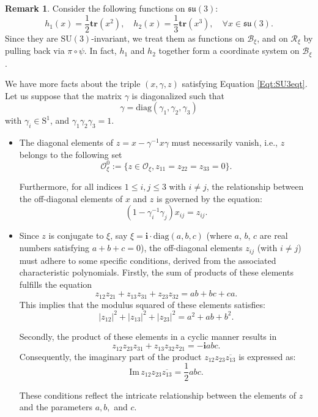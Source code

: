 \documentclass[12pt]{amsart}
\theoremstyle{definition}
\newtheorem{remark}[theorem]{Remark}
\numberwithin{equation}{section}
\def\diag{\mathrm{diag}}
\def\Im{\mathrm{Im}\,}
\newcommand{\abs}[1]{\lvert#1\rvert}
\newcommand{\Sone}{\mathrm{S}^1}
\newcommand{\imagunit}{\mathbf{i}}
\newcommand{\SU}{\mathrm{SU}}
\newcommand{\su}{\mathfrak{su}}
\newcommand{\Oxi}{\mathcal{O}_{\xi}}
\newcommand{\Reducedxi}{\mathcal{R}_\xi}
\newcommand{\SET}[1]{\{#1\}}
\newcommand{\Bxi}{\mathcal{B}_{\xi}}
\begin{document}
\begin{remark}   
     Consider    the following functions on $\su(3)$:
  $$
  h_1(x)=\frac{1}{2}\mathbf{tr}(x^2),\quad h_2(x)=\frac{1}{3}\mathbf{tr}(x^3),\quad \forall x\in \su(3).
  $$
  Since they are $\SU(3)$-invariant, we treat them as functions on $\Bxi $, and on  $\Reducedxi$ by pulling back via $\pi\circ \psi$. In fact, $h_1$ and $h_2$ together form a coordinate system on $\Bxi $ \cite{KKS,NR2003}.
\end{remark}

We have more facts about the triple $(x,\gamma,z)$ satisfying Equation \eqref{Eqt:SU3eqt}. Let us suppose that the matrix $\gamma$ is diagonalized such that $$\gamma = \diag(\gamma_1, \gamma_2, \gamma_3)$$ with $\gamma_i \in \Sone$, and $\gamma_1 \gamma_2 \gamma_3 = 1$.
\begin{itemize}
  \item The diagonal elements of $z=x - {\gamma^{-1}}x\gamma$ must necessarily vanish, i.e.,  $z$   belongs to the following set
   \begin{equation}
	\label{Notation:Oxi03}
	\Oxi^0:=\SET{ z\in \Oxi, z_{11}=z_{22}= z_{33}=0}.\end{equation}
	 
 
      
      
      Furthermore, for all indices $1 \leqslant i, j \leqslant 3$ with $i \neq j$, the relationship between the off-diagonal elements of $x$ and $z$ is governed by the equation:  
\begin{equation}\label{Eqt:SU3eqtxijzij}
	(1 - \gamma_i^{-1} \gamma_j) x_{ij} = z_{ij}.
\end{equation}
  \item Since \( z \) is conjugate to \( \xi\), say $\xi =\imagunit\cdot \diag(a , b  , c ) $ (where $a$, $b$, $c$ are real numbers satisfying $a+b+c=0$), the off-diagonal elements \( z_{ij} \) (with \( i \neq j \)) must adhere to some specific conditions, derived from the associated characteristic polynomials. Firstly, the sum of products of these elements fulfills the equation $$z_{12}z_{21} + z_{13}z_{31} + z_{23}z_{32} = ab + bc + ca .$$ This implies that the modulus squared of these elements satisfies:
\begin{equation}\label{Eq:ModulusEntries(y)}
	\abs{z_{12}}^2 + \abs{z_{13}}^2 + \abs{z_{23}}^2 = a^2 + ab + b^2.
\end{equation}

Secondly, the product of these elements in a cyclic manner results in $$ z_{12}z_{23}z_{31} + z_{13}z_{32}z_{21} = -\imagunit abc  .$$ Consequently, the imaginary part of the product \( z_{12}z_{23}\overline{z_{13}} \) is expressed as:
\begin{equation}
	\label{Eq:ImaginaryEntries(y)}
	\Im{z_{12}z_{23}\overline{z_{13}}} = \frac{1}{2} abc.
\end{equation}

These conditions reflect the intricate relationship between the elements of \( z \) and the parameters \( a, b, \) and \( c \).
 
\end{itemize}
  
\end{document}
